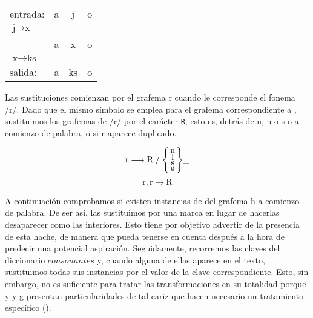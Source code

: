 \begin{exe}
	\ex\label{ex:xj}\strut\hfill\begin{tabular}{ l|*{3}{c}} 
		entrada: &  \multicolumn{1}{|c|}{a} &  \multicolumn{1}{|c|}{j} &  \multicolumn{1}{|c|}{o} \\ 
		$\text{j} \longrightarrow \text{x}$ &   &  \uparrow& \\
		&   \multicolumn{1}{|c|}{a} &  \multicolumn{1}{|c|}{x} &  \multicolumn{1}{|c|}{o}\\
		$\text{x} \longrightarrow \text{ks}$ &   &   \uparrow &  \\
		salida: &   \multicolumn{1}{|c|}{a} &  \multicolumn{1}{|c|}{ks} &  \multicolumn{1}{|c|}{o} \\
	\end{tabular}\hfill\strut
\end{exe}

Las sustituciones comienzan por el grafema \textlangle{}r\textrangle{} cuando le corresponde el fonema /r/. Dado que el mismo símbolo se emplea para el grafema correspondiente a , sustituimos los grafemas de /r/ por el carácter \texttt{R}, esto es, detrás de \textlangle{}n\textrangle{}, \textlangle{}n\textrangle{} o \textlangle{}s\textrangle{} o a comienzo de palabra, o si \textlangle{}r\textrangle{} aparece duplicado.

\[\text{r} \longrightarrow \text{R}\;/\; \Bigg\{\begin{smallmatrix} \text{\normalsize{n}} \\ \text{\normalsize{l}} \\ \text{\normalsize{s}} \\ \emptyset\end{smallmatrix}\Bigg\} \_\]
\[\text{r}, \text{r} \longrightarrow \text{R} \]

A continuación comprobamos si existen instancias de del grafema \textlangle{}h\textrangle{} a comienzo de palabra. De ser así, las sustituimos por una marca en lugar de hacerlas desaparecer como las interiores. Esto tiene por objetivo advertir de la presencia de esta hache, de manera que pueda tenerse en cuenta después a la hora de predecir una potencial aspiración. Seguidamente, recorremos las claves del diccionario $consonantes$ y, cuando alguna de ellas aparece en el texto, sustituimos todas sus instancias por el valor de la clave correspondiente. Esto, sin embargo, no es suficiente para tratar las transformaciones en su totalidad porque \textlangle{}y\textrangle{} y \textlangle{}g\textrangle{} presentan particularidades de tal cariz que hacen necesario un tratamiento específico ().

